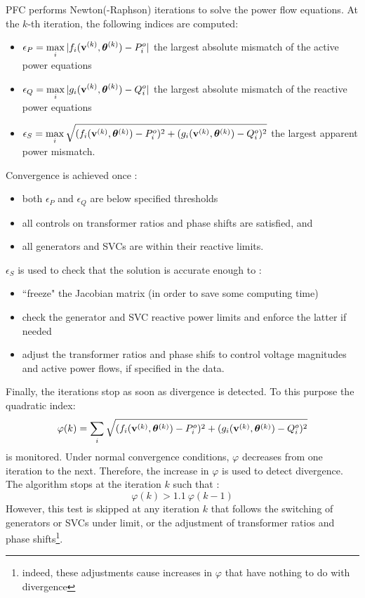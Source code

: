 PFC performs Newton(-Raphson) iterations to solve the power flow equations. At the $k$-th iteration, the following indices are computed:
\begin{itemize}
\item[] $\displaystyle \epsilon_P = \max_i |f_i({\bf v}^{(k)}, {\bm \theta}^{(k)}) - P^o_i|$ the largest absolute mismatch of the active power equations
\item[] $\displaystyle \epsilon_Q = \max_i |g_i({\bf v}^{(k)}, {\bm \theta}^{(k)}) - Q^o_i|$ the largest absolute mismatch of the reactive power equations
\item[] $\displaystyle \epsilon_S = \max_i \sqrt{(f_i({\bf v}^{(k)}, {\bm \theta}^{(k)}) - P^o_i)^2 + 
    (g_i({\bf v}^{(k)}, {\bm \theta}^{(k)}) - Q^o_i)^2}$ the largest apparent power mismatch.
\end{itemize}
Convergence is achieved once :
\begin{itemize}
\item both $\epsilon_P$ and $\epsilon_Q$ are below specified thresholds
\item all controls on transformer ratios and phase shifts are satisfied, and
\item all generators and SVCs are within their reactive limits.
\end{itemize}

$\epsilon_S$ is used to check that the solution is accurate enough to :
\begin{itemize}
\item ``freeze" the Jacobian matrix (in order to save some computing time)
\item check the generator and SVC reactive power limits and enforce the latter if needed
\item adjust the transformer ratios and phase shifs to control voltage magnitudes and active power flows, if specified in the data.
\end{itemize}

Finally, the iterations stop as soon as divergence is detected. To this purpose the quadratic index:
\[  \varphi(k) = \sum_i \sqrt{(f_i({\bf v}^{(k)}, {\bm \theta}^{(k)}) - P^o_i)^2 + (g_i({\bf v}^{(k)}, {\bm \theta}^{(k)}) - Q^o_i)^2} \]
is monitored. Under normal convergence conditions, $\varphi$ decreases from one iteration to the next. Therefore, the increase in $\varphi$ is used to detect divergence. The algorithm stops at the iteration $k$ such that :
\[ \varphi (k) > 1.1 \: \varphi(k-1) \]
However, this test is skipped at any iteration $k$ that follows the switching of generators or SVCs under limit, or the adjustment of transformer ratios and phase shifts\footnote{indeed, these adjustments cause increases in $\varphi$ that have nothing to do with divergence}.

